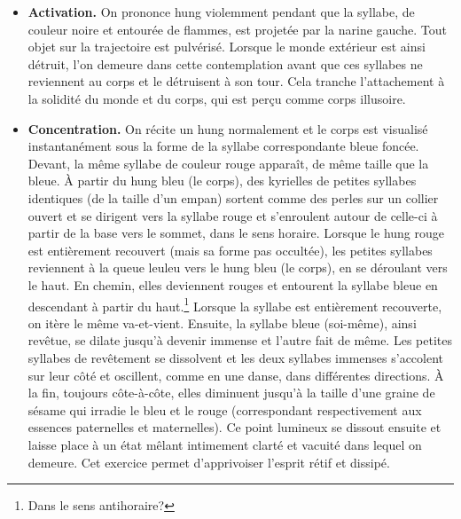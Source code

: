 \documentclass[11pt,a4paper]{article}
\begin{document}
\begin{itemize}
\begin{itemize}
      \item \textbf{Activation.} On prononce \textsf{hung} violemment
      pendant que la syllabe, de couleur noire et entourée de flammes,
      est projetée par la narine gauche. Tout objet sur la trajectoire
      est pulvérisé. Lorsque le monde extérieur est ainsi détruit,
      l'on demeure dans cette contemplation avant que ces syllabes ne
      reviennent au corps et le détruisent à son tour. Cela tranche
      l'attachement à la solidité du monde et du corps, qui est perçu
      comme corps illusoire.

      \item \textbf{Concentration.} On récite un \textsf{hung}
      normalement et le corps est visualisé instantanément sous la
      forme de la syllabe correspondante bleue foncée. Devant, la même
      syllabe de couleur rouge apparaît, de même taille que la
      bleue. À partir du \textsf{hung} bleu (le corps), des kyrielles
      de petites syllabes identiques (de la taille d'un empan) sortent
      comme des perles sur un collier ouvert et se dirigent vers la
      syllabe rouge et s'enroulent autour de celle\hyp{}ci à partir de
      la base vers le sommet, dans le sens horaire. Lorsque le
      \textsf{hung} rouge est entièrement recouvert (mais sa forme pas
      occultée), les petites syllabes reviennent à la queue leuleu
      vers le \textsf{hung} bleu (le corps), en se déroulant vers le
      haut. En chemin, elles deviennent rouges et entourent la syllabe
      bleue en descendant à partir du haut.\footnote{Dans le sens
      antihoraire?} Lorsque la syllabe est entièrement recouverte, on
      itère le même va\hyp{}et\hyp{}vient. Ensuite, la syllabe bleue
      (soi\hyp{}même), ainsi revêtue, se dilate jusqu'à devenir
      immense et l'autre fait de même. Les petites syllabes de
      revêtement se dissolvent et les deux syllabes immenses
      s'accolent sur leur côté et oscillent, comme en une danse, dans
      différentes directions. À la fin, toujours
      côte\hyp{}à\hyp{}côte, elles diminuent jusqu'à la taille d'une
      graine de sésame qui irradie le bleu et le rouge (correspondant
      respectivement aux essences paternelles et maternelles). Ce
      point lumineux se dissout ensuite et laisse place à un état
      mêlant intimement clarté et vacuité dans lequel on demeure. Cet
      exercice permet d'apprivoiser l'esprit rétif et dissipé.


\end{itemize}
\end{itemize}
\end{document}
